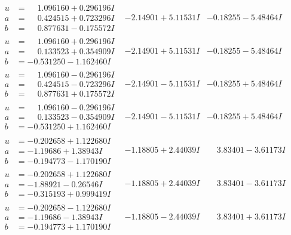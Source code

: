 \documentclass[1p]{elsarticle_modified}
\theoremstyle{definition}
\begin{document}
$$\begin{array}{c|c|c}
\begin{aligned}
u &= \phantom{-}1.096160 + 0.296196 I \\
a &= \phantom{-}0.424515 + 0.723296 I \\
b &= \phantom{-}0.877631 - 0.175572 I\end{aligned}
 & -2.14901 + 5.11531 I & -0.18255 - 5.48464 I \\ \hline\begin{aligned}
u &= \phantom{-}1.096160 + 0.296196 I \\
a &= \phantom{-}0.133523 + 0.354909 I \\
b &= -0.531250 - 1.162460 I\end{aligned}
 & -2.14901 + 5.11531 I & -0.18255 - 5.48464 I \\ \hline\begin{aligned}
u &= \phantom{-}1.096160 - 0.296196 I \\
a &= \phantom{-}0.424515 - 0.723296 I \\
b &= \phantom{-}0.877631 + 0.175572 I\end{aligned}
 & -2.14901 - 5.11531 I & -0.18255 + 5.48464 I \\ \hline\begin{aligned}
u &= \phantom{-}1.096160 - 0.296196 I \\
a &= \phantom{-}0.133523 - 0.354909 I \\
b &= -0.531250 + 1.162460 I\end{aligned}
 & -2.14901 - 5.11531 I & -0.18255 + 5.48464 I \\ \hline\begin{aligned}
u &= -0.202658 + 1.122680 I \\
a &= -1.19686 + 1.38943 I \\
b &= -0.194773 - 1.170190 I\end{aligned}
 & -1.18805 + 2.44039 I & \phantom{-}3.83401 - 3.61173 I \\ \hline\begin{aligned}
u &= -0.202658 + 1.122680 I \\
a &= -1.88921 - 0.26546 I \\
b &= -0.315193 + 0.999419 I\end{aligned}
 & -1.18805 + 2.44039 I & \phantom{-}3.83401 - 3.61173 I \\ \hline\begin{aligned}
u &= -0.202658 - 1.122680 I \\
a &= -1.19686 - 1.38943 I \\
b &= -0.194773 + 1.170190 I\end{aligned}
 & -1.18805 - 2.44039 I & \phantom{-}3.83401 + 3.61173 I \\ \hline\begin{aligned}

\end{aligned}
\end{array}$$
\end{document}
